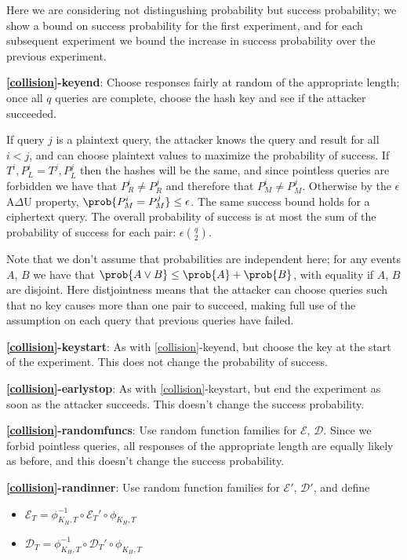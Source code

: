 \documentclass[journal=tosc,preprint,floatrow,submission]{iacrtrans}
\newcommand*{\xprm}[2]{\textsf{\ref*{#1}-#2}}
\newcommand*{\xprmtitle}[2]{\textbf{\xprm{#1}{#2}}}
\newcommand*{\calE}{\mathcal{E}}
\newcommand*{\calD}{\mathcal{D}}
\begin{document}
Here we are considering not distingushing probability but success probability; we
show a bound on success probability for the first experiment, and for each subsequent experiment
we bound the increase in success probability over the previous experiment.

\xprmtitle{collision}{keyend}: Choose responses fairly at random of the appropriate length;
once all $q$ queries are complete, choose the hash key and see if the attacker succeeded.

If query $j$ is a plaintext query, the attacker knows the query and result
for all $i < j$, and can choose plaintext values to maximize the probability of success.
If $T^i, P_L^i = T^j, P_L^j$ then the hashes will be the same, and since pointless
queries are forbidden we have that $P_R^i \neq P_R^j$ and therefore that
$P_M^i \neq P_M^j$. Otherwise by the $\epsilon$A$\Delta$U property,
$\prob{P_M^i = P_M^j} \leq \epsilon$. The same success bound holds for a ciphertext query.
The overall probability of success
is at most the sum of the probability of success for each pair:
$\epsilon\binom{q}{2}$.

Note that we don't assume that probabilities are independent here;
for any events $A$, $B$ we have that $\prob{A \vee B} \leq \prob{A} + \prob{B}$, with
equality if $A$, $B$ are disjoint. Here distjointness means that the attacker can
choose queries such that no key causes more than one pair to succeed, making full use of
the assumption on each query that previous queries have failed.

\xprmtitle{collision}{keystart}: As with \xprm{collision}{keyend}, but
choose the key at the start of the experiment. This
does not change the probability of success.

\xprmtitle{collision}{earlystop}: As with \xprm{collision}{keystart}, but
end the experiment as soon as the attacker succeeds.
This doesn't change the success probability.

\xprmtitle{collision}{randomfuncs}: Use random function families for $\calE$,
$\calD$. Since we forbid pointless queries,
all responses of the appropriate length are equally likely as before,
and this doesn't change the success probability.

\xprmtitle{collision}{randinner}: Use random function families for $\calE'$, $\calD'$, and define
\begin{itemize}
    \item $\calE_T = \phi^{-1}_{K_H, T} \circ \calE_T' \circ \phi_{K_H, T}$
    \item $\calD_T = \phi^{-1}_{K_H, T} \circ \calD_T' \circ \phi_{K_H, T}$
\end{itemize}
\end{document}
